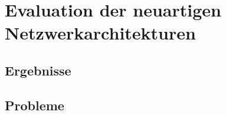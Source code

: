 \section{Evaluation der neuartigen Netzwerkarchitekturen}

\subsection{Ergebnisse}

\subsection{Probleme}

